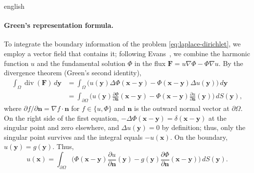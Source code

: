 \documentclass[0000.tex]{subfiles}
\begin{document}
\begin{hyphenrules}{english}
\paragraph{Green's representation formula.}
To integrate the boundary information of the problem \eqref{eq:laplace-dirichlet}, we employ a vector
field that contains
it; following Evans~\cite{evans2010}, we combine the harmonic function $u$ and the fundamental solution
$\Phi$ in the flux $\mathbf{F}=u\nabla\Phi-\Phi\nabla u$. By the divergence theorem (Green's second identity),
\begin{align}
  \int_\Omega\operatorname{div}(\mathbf{F})\,d\mathbf{y}
    &=\int_\Omega\big(u(\mathbf{y})\Delta\Phi(\mathbf{x}-\mathbf{y})-\Phi(\mathbf{x}-\mathbf{y})\Delta u(\mathbf{y})\big)\,d\mathbf{y} \label{eq:green2-a}\\
    &=\int_{\partial\Omega}\Big(u(\mathbf{y})\frac{\partial\Phi}{\partial\mathbf{n}}(\mathbf{x}-\mathbf{y})
      -\Phi(\mathbf{x}-\mathbf{y})\frac{\partial u}{\partial\mathbf{n}}(\mathbf{y})\Big)\,d S(\mathbf{y}), \label{eq:green2-b}
\end{align}
where $\partial f/\partial\mathbf{n}=\nabla f\cdot\mathbf{n}$ for $f\in\{u,\Phi\}$ and $\mathbf{n}$ is the outward normal vector
at $\partial\Omega$. On the right side of the first equation, $-\Delta\Phi(\mathbf{x}-\mathbf{y})=\delta(\mathbf{x}-\mathbf{y})$ at the
singular point and zero elsewhere, and $\Delta u(\mathbf{y})=0$ by definition; thus, only the singular point
survives and the integral equals $-u(\mathbf{x})$. On the boundary, $u(\mathbf{y})=g(\mathbf{y})$. Thus,
\begin{equation}
  u(\mathbf{x})=\int_{\partial\Omega}\Big(\Phi(\mathbf{x}-\mathbf{y})\frac{\partial u}{\partial\mathbf{n}}(\mathbf{y})
    -g(\mathbf{y})\frac{\partial\Phi}{\partial\mathbf{n}}(\mathbf{x}-\mathbf{y})\Big)\,d S(\mathbf{y}).
  \label{eq:laplace-rep}
\end{equation}


\end{hyphenrules}
\end{document}
